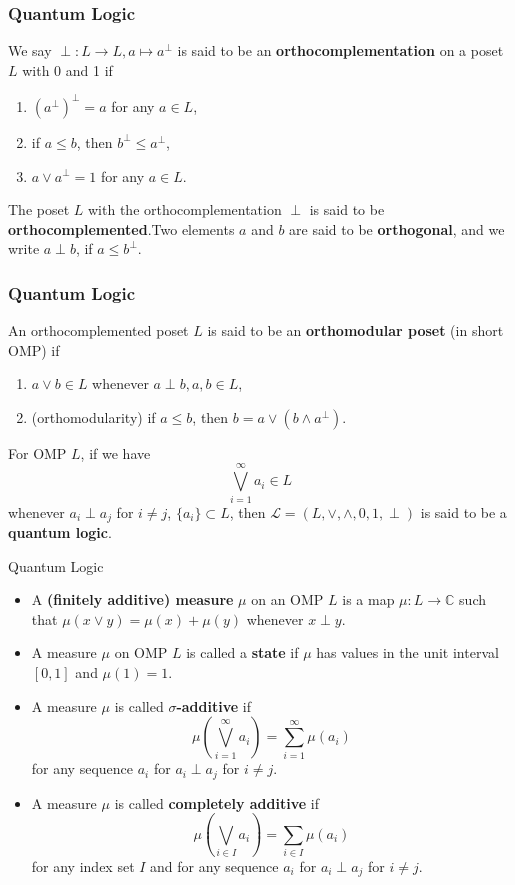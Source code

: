 \documentclass{beamer}
\begin{document}
\begin{frame}
    \frametitle{Quantum Logic}
We say \(\perp: L \to L, a \mapsto a^\perp \) is said to be an \textbf{orthocomplementation} on a poset \(L\) with 0 and 1 if
\begin{enumerate}
    \item \((a^\perp)^\perp = a\) for any \(a \in L\),\pause\\
    \item if \(a \le b\), then \(b^\perp \le a^\perp \),\pause
    \item \(a \vee a^\perp=1\) for any \(a\in L\).\pause
\end{enumerate}
The poset \(L\) with the orthocomplementation \(\perp\) is said to be \textbf{orthocomplemented}.\pause Two elements \(a\) and \(b\) are said to be \textbf{orthogonal}, and we write \(a\perp b\), if \(a\le b^\perp\).


\end{frame}

\begin{frame}
    \frametitle{Quantum Logic}
    An orthocomplemented poset \(L\) is said to be an \textbf{orthomodular poset} (in short OMP) if \pause
\begin{enumerate}
    \item \(a\vee b \in L\) whenever \(a\perp b,a,b \in L\),\pause
    \item (orthomodularity) if \(a\le b\), then \(b=a\vee(b\wedge a^\perp)\).\pause
\end{enumerate}
    For OMP \(L\), if we have
    \[\bigvee^{\infty}_{i=1} a_i \in L\]
    whenever \(a_i \perp a_j\) for \(i \neq j\), \(\{a_i\} \subset L\), then \(\mathcal{L}=(L,\vee,\wedge,0,1,\perp)\) is said to be a \textbf{quantum logic}.
\end{frame}

\begin{frame}{Quantum Logic}
    \begin{itemize}
        \item A \textbf{(finitely additive) measure} \(\mu\) on an OMP \(L\) is a map \(\mu: L \to \mathbb{C}\) such that \(\mu(x\vee y)=\mu(x) + \mu(y)\) whenever \(x \perp y\).\pause
        \item A measure \(\mu\) on OMP \(L\) is called a \textbf{state} if \(\mu\) has values in the unit interval \([0,1]\) and \(\mu(1)=1\).\pause
        \item A measure \(\mu\) is called \textbf{\(\sigma\)-additive} if \[\mu(\bigvee_{i=1}^{\infty}a_i)=\sum_{i=1}^{\infty} \mu(a_i)\] for any sequence \(a_i\) for \(a_i\perp a_j\) for \(i \neq j\).\pause
        \item A measure \(\mu\) is called \textbf{completely additive} if \[\mu(\bigvee_{i \in I} a_i)=\sum_{i\in I} \mu(a_i)\] for any index set \(I\) and for any sequence \(a_i\) for \(a_i\perp a_j\) for \(i \neq j\).
    \end{itemize}
    
\end{frame}
\end{document}
